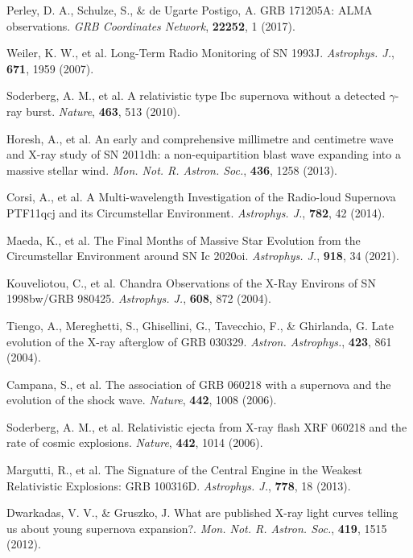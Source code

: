 \documentclass{nature_plusfigure}
\newcommand{\mn}{{Mon. Not. R. Astron. Soc.}}
\newcommand{\mnras}{\mn}
\newcommand{\apj}{{Astrophys. J.}}
\newcommand{\aap}{{Astron. Astrophys.}}
\newcommand{\nat}{{Nature}}
\begin{document}
\begin{methods}
\begin{thebibliography}{10}
 Perley, D. A., Schulze, S., \& de Ugarte Postigo, A. GRB 171205A: ALMA observations. \emph{GRB Coordinates Network}, \textbf{22252}, 1 (2017). 

 Weiler, K. W., et al. Long-Term Radio Monitoring of SN 1993J. \emph{\apj}, \textbf{671}, 1959 (2007). 

 Soderberg, A. M., et al. A relativistic type Ibc supernova without a detected $\gamma$-ray burst. \emph{\nat}, \textbf{463}, 513 (2010). 

 Horesh, A., et al. An early and comprehensive millimetre and centimetre wave and X-ray study of SN 2011dh: a non-equipartition blast wave expanding into a massive stellar wind. \emph{\mnras}, \textbf{436}, 1258 (2013). 

 Corsi, A., et al. A Multi-wavelength Investigation of the Radio-loud Supernova PTF11qcj and its Circumstellar Environment. \emph{\apj}, \textbf{782}, 42 (2014). 

 Maeda, K., et al. The Final Months of Massive Star Evolution from the Circumstellar Environment around SN Ic 2020oi. \emph{\apj}, \textbf{918}, 34 (2021). 

 Kouveliotou, C., et al. Chandra Observations of the X-Ray Environs of SN 1998bw/GRB 980425. \emph{\apj}, \textbf{608}, 872 (2004). 

 Tiengo, A., Mereghetti, S., Ghisellini, G., Tavecchio, F., \& Ghirlanda, G. Late evolution of the X-ray afterglow of GRB 030329. \emph{\aap}, \textbf{423}, 861 (2004). 

 Campana, S., et al. The association of GRB 060218 with a supernova and the evolution of the shock wave. \emph{\nat}, \textbf{442}, 1008 (2006). 

 Soderberg, A. M., et al. Relativistic ejecta from X-ray flash XRF 060218 and the rate of cosmic explosions. \emph{\nat}, \textbf{442}, 1014 (2006). 

 Margutti, R., et al. The Signature of the Central Engine in the Weakest Relativistic Explosions: GRB 100316D. \emph{\apj}, \textbf{778}, 18 (2013). 

 Dwarkadas, V. V., \& Gruszko, J. What are published X-ray light curves telling us about young supernova expansion?. \emph{\mnras}, \textbf{419}, 1515 (2012). 



\end{thebibliography}
\end{methods}
\end{document}
